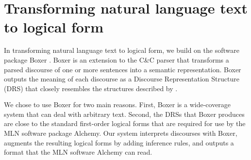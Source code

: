 \section{Transforming natural language text to logical form}

In transforming natural language text to logical form, we build on the software
package Boxer \citep{bos:coling2004}. Boxer
is an extension to the C\&C parser \citep{clark:acl04} that transforms a parsed
discourse of one or more sentences into a semantic representation.  Boxer
outputs the meaning of each discourse as a Discourse Representation Structure
(DRS) that closely resembles the structures described by \citet{kamp:book93}.

We chose to use Boxer for two main reasons.  First, Boxer is a wide-coverage
system that can deal with arbitrary text.
Second, the DRSs that Boxer produces are close to the standard first-order
logical forms that are required for use by the MLN software package Alchemy.
Our system interprets discourses with Boxer, augments the resulting logical
forms by adding inference rules, and outputs a format that the MLN
software Alchemy can read.
